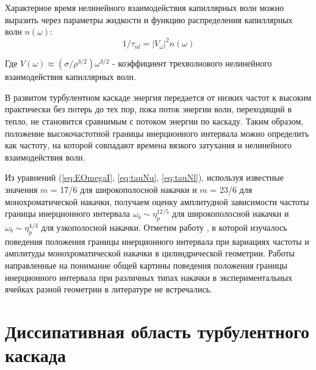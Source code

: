 Характерное время нелинейного взаимодействия капиллярных волн можно выразить через параметры жидкости и функцию распределения капиллярных волн $n(\omega)$:
\begin{equation}
\label{eq:tauNl}
1/\tau_{nl} = |V_\omega|^2 n(\omega)
\end{equation}

Где $V(\omega) \approx (\sigma/\rho^{3/2})\omega^{3/2}$ - коэффициент трехволнового нелинейного взаимодействия капиллярных волн.

В развитом турбулентном каскаде энергия передается от низких частот к высоким практически без потерь до тех пор, пока поток энергии волн, переходящий в тепло, не становится сравнимым с потоком энергии по каскаду. Таким образом, положение высокочастотной границы инерционного интервала можно определить как частоту, на которой совпадают времена вязкого затухания и нелинейного взаимодействия волн.

Из уравнений (\ref{eq:EOmegaI}, \ref{eq:tauNu}, \ref{eq:tauNl}), используя известные значения $m$ = 17/6 для широкополосной накачки и $m$ = 23/6 для монохроматической накачки, получаем оценку амплитудной зависимости частоты границы инерционного интервала $\omega_b \sim \eta_p^{12/5}$ для широкополосной накачки и $\omega_b \sim \eta_p^{4/3}$ для узкополосной накачки. Отметим работу \cite{Brazhnikov_bound_freq}, в которой изучалось поведения положения границы инерционного интервала при вариациях частоты и амплитуды монохроматической накачки в цилиндрической геометрии. Работы направленные на понимание общей картины поведения положения границы инерционного интервала при различных типах накачки в экспериментальных ячейках разной геометрии в литературе не встречались.

\section{Диссипативная область турбулентного каскада}%

